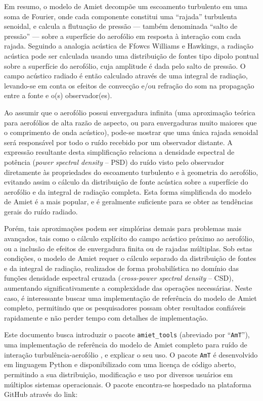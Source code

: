 \documentclass[a4paper, 11pt, twoside]{article}
\newcommand{\AmT}{\texttt{AmT}}
\begin{document}
Em resumo, o modelo de Amiet decompõe um escoamento turbulento em uma soma de Fourier, onde cada componente constitui uma ``rajada'' turbulenta senoidal, e calcula a flutuação de pressão --- também denominada ``salto de pressão'' --- sobre a superfície do aerofólio em resposta à interação com cada rajada. Seguindo a analogia acústica de Ffowcs Williams e Hawkings, a radiação acústica pode ser calculada usando uma distribuição de fontes tipo dipolo pontual sobre a superfície do aerofólio, cuja amplitude é dada pelo salto de pressão. O campo acústico radiado é então calculado através de uma integral de radiação, levando-se em conta os efeitos de convecção e/ou refração do som na propagação entre a fonte e o(s) observador(es).

Ao assumir que o aerofólio possui envergadura infinita (uma aproximação teórica para aerofólios de alta razão de aspecto, ou para envergaduras muito maiores que o comprimento de onda acústico), pode-se mostrar que uma única rajada senoidal será responsável por todo o ruído recebido por um observador distante. A expressão resultante desta simplificação relaciona a densidade espectral de potência (\emph{power spectral density} -- PSD) do ruído visto pelo observador diretamente às propriedades do escoamento turbulento e à geometria do aerofólio, evitando assim o cálculo da distribuição de fonte acústica sobre a superfície do aerofólio e da integral de radiação completa. Esta forma simplificada do modelo de Amiet é a mais popular, e é geralmente suficiente para se obter as tendências gerais do ruído radiado. 

Porém, tais aproximações podem ser simplórias demais para problemas mais avançados, tais como o cálculo explícito do campo acústico próximo ao aerofólio, ou a inclusão de efeitos de envergadura finita ou de rajadas múltiplas. Sob estas condições, o modelo de Amiet requer o cálculo separado da distribuição de fontes e da integral de radiação, realizados de forma probabilística no domínio das funções densidade espectral cruzada (\emph{cross-power spectral density} -- CSD), aumentando significativamente a complexidade das operações necessárias. Neste caso, é interessante buscar uma implementação de referência do modelo de Amiet completo, permitindo que os pesquisadores possam obter resultados confiáveis rapidamente e não perder tempo com detalhes de implementação.

Este documento busca introduzir o pacote \verb|amiet_tools| (abreviado por ``\AmT{}''), uma implementação de referência do modelo de Amiet completo para ruído de interação turbulência-aerofólio \cite{Casagrande_etal2020}, e explicar o seu uso. O pacote \AmT{} é desenvolvido em linguagem Python e disponibilizado com uma licença de código aberto, permitindo a sua distribuição, modificação e uso por diversos usuários em múltiplos sistemas operacionais. O pacote encontra-se hospedado na plataforma GitHub através do link:
\end{document}
